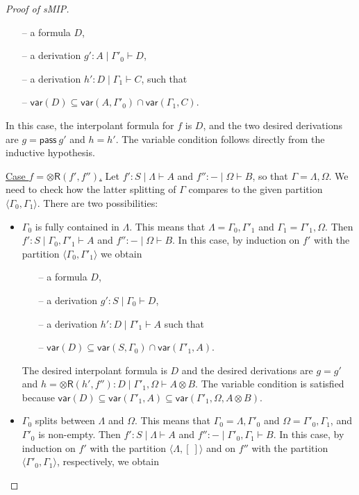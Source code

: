 \documentclass[sn-mathphys-num]{sn-jnl}%
\newcommand{\GG}{\Gamma}
\newcommand{\GL}{\Lambda}
\newcommand{\GO}{\Omega}
\newcommand{\vd}{\vdash}
\newcommand{\tr}{\otimes\mathsf{R}}
\newcommand{\pass}{\mathsf{pass}}
\newcommand{\ot}{\otimes}
\newcommand{\mf}[1]{\mathsf{#1}}
\newcommand{\vars}[1]{\mf{var} (#1)}
\newcommand{\sMIP}{\textsf{sMIP}}
\theoremstyle{thmstyleone}%
\theoremstyle{thmstyletwo}%
\theoremstyle{thmstylethree}%
\begin{document}
\begin{proof}[Proof of \sMIP]
\begin{itemize}
    \begin{itemize}
      \item[--] a formula $D$,
      \item[--] a derivation $g' : A \mid \GG'_0 \vd D$,
      \item[--] a derivation $h' : D \mid \GG_1 \vd C$, such that
      \item[--] $\vars{D} \subseteq \vars{A, \GG'_0} \cap \vars{\GG_1, C}$.
    \end{itemize}
    In this case, the interpolant formula for $f$ is $D$, and the two desired derivations are $g = \pass \ g'$ and $h = h'$.
    The variable condition follows directly from the inductive hypothesis.
  \end{itemize} 
  \underline{Case $f = \tr (f',f'')$.} Let $f' : S \mid \GL \vd A$ and $f'' : {-} \mid \GO \vd B$, so that $\GG = \GL,\GO$. We need to check how the latter splitting of $\GG$ compares to the given partition $\langle \GG_0,\GG_1 \rangle$. 
  There are two possibilities:
  \begin{itemize}
    \item $\GG_0$ is fully contained in $\GL$. 
    This means that $\GL = \GG_0 , \GG'_1$ and $\GG_1 = \GG'_1,\GO$.
    Then $f' : S \mid \GG_0 , \GG'_1 \vd A$ and $f'' : {-} \mid \GO \vd B$.
    In this case, by induction on $f'$ with the partition $\langle \GG_0 , \GG'_1 \rangle$ we obtain
    \begin{itemize}
      \item[--] a formula $D$,
      \item[--] a derivation $g' : S \mid \GG_0 \vd D$, 
      \item[--] a derivation $h' : D \mid \GG'_1 \vd A$ such that 
      \item[--] $\vars{D} \subseteq \vars{S, \GG_0} \cap \vars{\GG'_1 , A}$.
    \end{itemize}
    The desired interpolant formula is $D$ and the desired derivations are $g = g'$ and $h = \tr (h' , f'') : D \mid \GG'_1 , \GO \vd A \ot B$.
    The variable condition is satisfied because $\vars{D} \subseteq \vars{\GG'_1 , A} \subseteq \vars{\GG'_1 , \GO , A \ot B}$.
    \item  $\GG_0$ splits between $\GL$ and $\GO$. 
    This means that $\GG_0 = \GL,\GG'_0$ and $\GO = \GG'_0,\GG_1$, and $\GG'_0$ is non-empty.
    Then $f' : S \mid \GL \vd A$ and $f'': {-} \mid \GG'_0, \GG_1 \vd B$.
    In this case, by induction on $f'$ with the partition $\langle \GL , [\ ] \rangle $ and on $f''$ with the partition $\langle \GG'_0 , \GG_1 \rangle$, respectively, we obtain

\end{itemize}
\end{proof}
\end{document}
